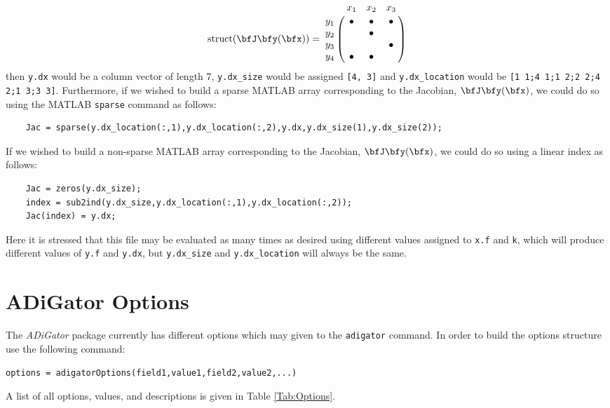 \documentclass[10pt,pdftex]{article}
\let\bbordermatrix\bordermatrix
\begin{document}
\begin{equation}
\text{struct}(\bfJ\bfy(\bfx)) = \bbordermatrix{~ & x_1 & x_2 & x_3 \cr
y_1 & \bullet & \bullet & \bullet \cr
y_2 & ~ & \bullet & ~ \cr
y_3 & ~ & ~ & \bullet \cr
y_4 & \bullet & \bullet & ~}
\end{equation}
then \texttt{y.dx} would be a column vector of length 7, \texttt{y.dx\_size} would be assigned \texttt{[4, 3]} and \texttt{y.dx\_location} would be \texttt{[1 1;4 1;1 2;2 2;4 2;1 3;3 3]}. Furthermore, if we wished to build a sparse MATLAB array corresponding to the Jacobian, $\bfJ\bfy(\bfx)$,  we could do so using the MATLAB \texttt{sparse} command as follows:
\begin{verbatim}
    Jac = sparse(y.dx_location(:,1),y.dx_location(:,2),y.dx,y.dx_size(1),y.dx_size(2));
\end{verbatim}
If we wished to build a non-sparse MATLAB array corresponding to the Jacobian,  $\bfJ\bfy(\bfx)$, we could do so using  a linear index as follows:
\begin{verbatim}
    Jac = zeros(y.dx_size);
    index = sub2ind(y.dx_size,y.dx_location(:,1),y.dx_location(:,2));
    Jac(index) = y.dx;
\end{verbatim}
Here it is stressed that this file may be evaluated as many times as desired using different values assigned to \texttt{x.f} and \texttt{k}, which will produce different values of \texttt{y.f} and \texttt{y.dx}, but \texttt{y.dx\_size} and \texttt{y.dx\_location} will always be the same.
\section{ADiGator Options}\label{Sec:Options}
The \emph{ADiGator} package currently has different options which may given to the \texttt{adigator} command. In order to build the options structure use the following command:\\
\centerline{\texttt{options = adigatorOptions(field1,value1,field2,value2,...)}}
A list of all options, values, and descriptions is given in Table \ref{Tab:Options}.
\end{document}
